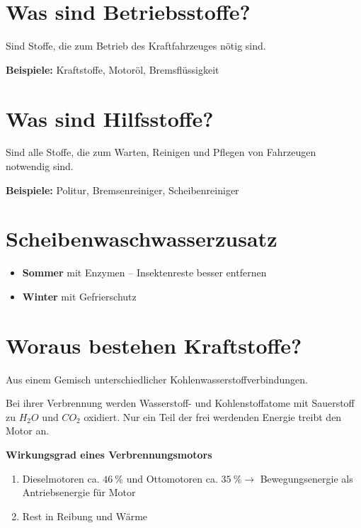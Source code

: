 \section{Was sind Betriebsstoffe?}\label{was-sind-betriebsstoffe}

Sind Stoffe, die zum Betrieb des Kraftfahrzeuges nötig sind.

\textbf{Beispiele:} Kraftstoffe, Motoröl, Bremsflüssigkeit

\section{Was sind Hilfsstoffe?}\label{was-sind-hilfsstoffe}

Sind alle Stoffe, die zum Warten, Reinigen und Pflegen von Fahrzeugen
notwendig sind.

\textbf{Beispiele:} Politur, Bremsenreiniger, Scheibenreiniger

\section{Scheibenwaschwasserzusatz}\label{scheibenwaschwasserzusatz}

\begin{itemize}
\item
  \textbf{Sommer} mit Enzymen -- Insektenreste besser entfernen
\item
  \textbf{Winter} mit Gefrierschutz
\end{itemize}

\section{Woraus bestehen
Kraftstoffe?}\label{woraus-bestehen-kraftstoffe}

Aus einem Gemisch unterschiedlicher Kohlenwasserstoffverbindungen.

Bei ihrer Verbrennung werden Wasserstoff- und Kohlenstoffatome mit
Sauerstoff zu $H_{2}O \text{ und } CO_2$ oxidiert. Nur ein Teil der
frei werdenden Energie treibt den Motor an.

\textbf{Wirkungsgrad eines Verbrennungsmotors}

\begin{enumerate}
\item
  Dieselmotoren ca. $46~\%$ und Ottomotoren ca. $35~\% \to$
  Bewegungsenergie als Antriebsenergie für Motor
\item
  Rest in Reibung und Wärme
\end{enumerate}

